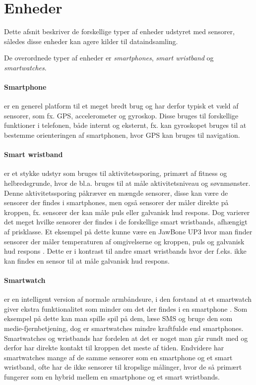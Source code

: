 \section{Enheder}\label{sec:kilder-til-sensorer}
Dette afsnit beskriver de forskellige typer af enheder udstyret med sensorer, således disse enheder kan agere kilder til dataindsamling.

De overordnede typer af enheder er \textit{smartphones}, \textit{smart wristband} og \textit{smartwatches}. 

\paragraph{Smartphone}
er en generel platform til et meget bredt brug og har derfor typisk et væld af sensorer, som fx. GPS, accelerometer og gyroskop.
Disse bruges til forskellige funktioner i telefonen, både internt og eksternt, fx. kan gyroskopet bruges til at bestemme orienteringen af smartphonen, hvor GPS kan bruges til navigation.

\paragraph{Smart wristband} %
er et stykke udstyr som bruges til aktivitetssporing, primært af fitness og helbredsgrunde, hvor de bl.a. bruges til at måle aktivitetsniveau og søvnmønster.
Denne aktivitetssporing påkræver en mængde sensorer, disse kan være de sensorer der findes i smartphones, men også sensorer der måler direkte på kroppen, fx. sensorer der kan måle puls eller galvanisk hud respons. 
Dog varierer det meget hvilke sensorer der findes i de forskellige smart wristbands, afhængigt af prisklasse.
Et eksempel på dette kunne være en JawBone UP3 hvor man finder sensorer der måler temperaturen af omgivelserne og kroppen, puls og galvanisk hud respons \citep{misc:jawboneup3sensors}. 
Dette er i kontrast til andre smart wristbands hvor der f.eks. ikke kan findes en sensor til at måle galvanisk hud respons.

\paragraph{Smartwatch}
er en intelligent version af normale armbåndsure, i den forstand at et smartwatch giver ekstra funktionalitet som minder om det der findes i en smartphone \citep{msic:smartwatchstate}. 
Som eksempel på dette kan man spille spil på dem, læse SMS og bruge den som medie-fjernbetjening, dog er smartwatches mindre kraftfulde end smartphones. 
Smartwatches og wristbands har fordelen at det er noget man går rundt med og derfor har direkte kontakt til kroppen det meste af tiden.
Endvidere har smartwatches mange af de samme sensorer som en smartphone og et smart wristband, ofte har de ikke sensorer til kropslige målinger, hvor de så primært fungerer som en hybrid mellem en smartphone og et smart wristbands.

